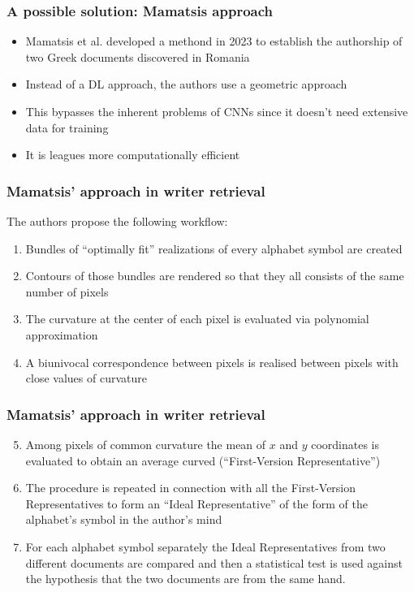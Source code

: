 \documentclass{beamer}
\begin{document}
\begin{frame}
	\frametitle{A possible solution: Mamatsis approach}
	\begin{itemize}
		\item Mamatsis et al. developed a methond in 2023 to establish the authorship of two Greek documents discovered in Romania
		\item Instead of a DL approach, the authors use a geometric approach
		\item This bypasses the inherent problems of CNNs since it doesn't need extensive data for training
		\item It is leagues more computationally efficient
	\end{itemize}
\end{frame}
\begin{frame}
	\frametitle{Mamatsis' approach in writer retrieval}
	The authors propose the following workflow:
		\begin{enumerate}
			\item Bundles of ``optimally fit'' realizations of every alphabet symbol are created
			\item Contours of those bundles are rendered so that they all consists of the same number of pixels
			\item The curvature at the center of each pixel is evaluated via polynomial approximation
			\item A biunivocal correspondence between pixels is realised between pixels with close values of curvature
		\end{enumerate}
\end{frame}
\begin{frame}
	\frametitle{Mamatsis' approach in writer retrieval}
	\begin{enumerate}
		\setcounter{enumi}{4}
		\item Among pixels of common curvature the mean of $x$ and $y$ coordinates is evaluated to obtain an average curved (``First-Version Representative'')
		\item The procedure is repeated in connection with all the First-Version Representatives to form an ``Ideal Representative'' of the form of the alphabet's symbol in the author's mind
		\item For each alphabet symbol separately the Ideal Representatives from two different documents are compared and then a statistical test is used against the hypothesis that the two documents are from the same hand.
	\end{enumerate}
\end{frame}
\end{document}
